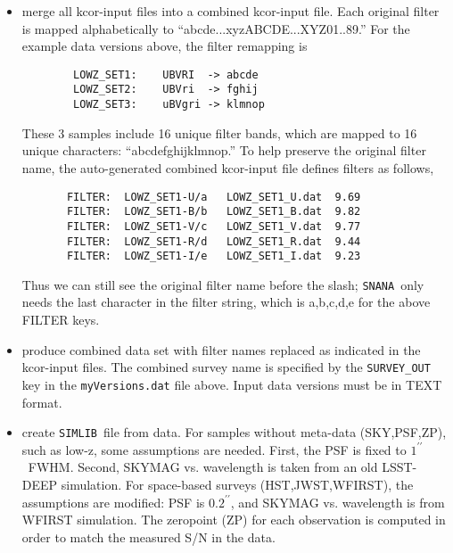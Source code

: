 \documentclass[12pt]{article}
\newcommand{\snana}{{\tt SNANA}}
\newcommand{\simlib}{{\tt SIMLIB}}
\begin{document}
\begin{itemize}
  \item  merge all kcor-input files into a combined kcor-input file.
    Each original filter is mapped alphabetically to 
``abcde...xyzABCDE...XYZ01..89.''
    For the example data versions above, the filter remapping is 
    \vspace{-0.5cm}    \begin{verbatim}
        LOWZ_SET1:    UBVRI  -> abcde  
        LOWZ_SET2:    UBVri  -> fghij  
        LOWZ_SET3:    uBVgri -> klmnop 
    \end{verbatim}  \vspace{-0.8cm}
%
    These 3 samples include 16 unique filter bands, which are
    mapped to 16 unique characters: ``abcdefghijklmnop.''
    To help preserve the original filter name, the auto-generated
    combined kcor-input file defines filters as follows,
    \vspace{-0.5cm} \begin{verbatim}
       FILTER:  LOWZ_SET1-U/a   LOWZ_SET1_U.dat  9.69
       FILTER:  LOWZ_SET1-B/b   LOWZ_SET1_B.dat  9.82
       FILTER:  LOWZ_SET1-V/c   LOWZ_SET1_V.dat  9.77
       FILTER:  LOWZ_SET1-R/d   LOWZ_SET1_R.dat  9.44
       FILTER:  LOWZ_SET1-I/e   LOWZ_SET1_I.dat  9.23
    \end{verbatim}\vspace{-0.8cm}
%
    Thus we can still see the original filter name before the slash;
    \snana\ only needs the last character in the filter string, which
    is a,b,c,d,e for the above FILTER keys.
%
  \item produce combined data set with filter names replaced as 
        indicated in the kcor-input files. The combined survey
        name is specified by the {\tt SURVEY\_OUT} key in the
        {\tt myVersions.dat} file above.
        Input data versions must be in TEXT format.
%
  \item create \simlib\ file from data. For samples without meta-data
     (SKY,PSF,ZP), such as low-z, some assumptions are needed.
     First, the PSF is fixed to $1^{\prime\prime}$~FWHM. 
     Second, SKYMAG vs. wavelength is taken from an old LSST-DEEP 
     simulation.  For space-based surveys (HST,JWST,WFIRST),
     the assumptions are modified: PSF is $0.2^{\prime\prime}$,
     and SKYMAG vs. wavelength is from WFIRST simulation.
     The zeropoint (ZP) for each observation is computed in order 
     to match the measured S/N in the data.
\end{itemize}
\end{document}
